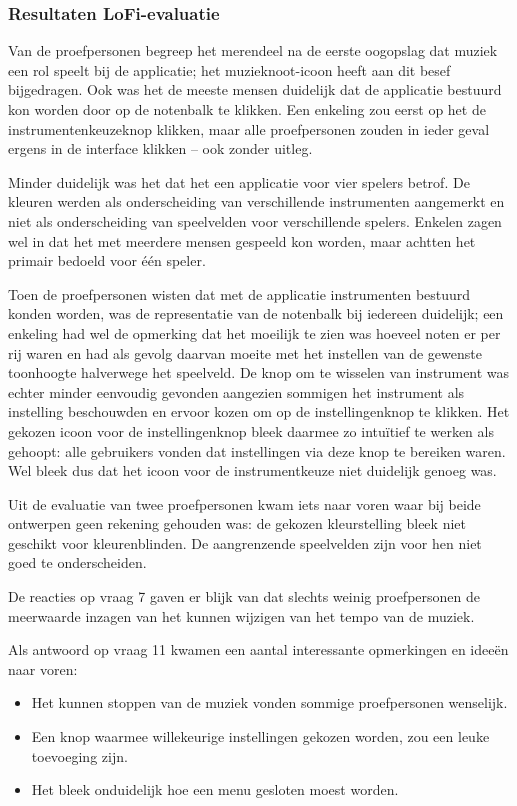 \documentclass{acm}
\begin{document}
\subsubsection{Resultaten LoFi-evaluatie}
Van de proefpersonen begreep het merendeel na de eerste oogopslag dat muziek een rol speelt bij de applicatie; het muzieknoot-icoon heeft aan dit besef bijgedragen. Ook was het de meeste mensen duidelijk dat de applicatie bestuurd kon worden door op de notenbalk te klikken. Een enkeling zou eerst op het de instrumentenkeuzeknop klikken, maar alle proefpersonen zouden in ieder geval ergens in de interface klikken -- ook zonder uitleg.

Minder duidelijk was het dat het een applicatie voor vier spelers betrof. De kleuren werden als onderscheiding van verschillende instrumenten aangemerkt en niet als onderscheiding van speelvelden voor verschillende spelers. Enkelen zagen wel in dat het met meerdere mensen gespeeld kon worden, maar achtten het primair bedoeld voor \'e\'en speler.

Toen de proefpersonen wisten dat met de applicatie instrumenten bestuurd konden worden, was de representatie van de notenbalk bij iedereen duidelijk; een enkeling had wel de opmerking dat het moeilijk te zien was hoeveel noten er per rij waren en had als gevolg daarvan moeite met het instellen van de gewenste toonhoogte halverwege het speelveld. De knop om te wisselen van instrument was echter minder eenvoudig gevonden aangezien sommigen het instrument als instelling beschouwden en ervoor kozen om op de instellingenknop te klikken. Het gekozen icoon voor de instellingenknop bleek daarmee zo intu\"itief te werken als gehoopt: alle gebruikers vonden dat instellingen via deze knop te bereiken waren. Wel bleek dus dat het icoon voor de instrumentkeuze niet duidelijk genoeg was.

Uit de evaluatie van twee proefpersonen kwam iets naar voren waar bij beide ontwerpen geen rekening gehouden was: de gekozen kleurstelling bleek niet geschikt voor kleurenblinden. De aangrenzende speelvelden zijn voor hen niet goed te onderscheiden.

De reacties op vraag 7 gaven er blijk van dat slechts weinig proefpersonen de meerwaarde inzagen van het kunnen wijzigen van het tempo van de muziek.

Als antwoord op vraag 11 kwamen een aantal interessante opmerkingen en idee\"en naar voren:
\begin{itemize}
  \item Het kunnen stoppen van de muziek vonden sommige proefpersonen wenselijk.
  \item Een knop waarmee willekeurige instellingen gekozen worden, zou een leuke toevoeging zijn.
  \item Het bleek onduidelijk hoe een menu gesloten moest worden.
\end{itemize}
\end{document}
